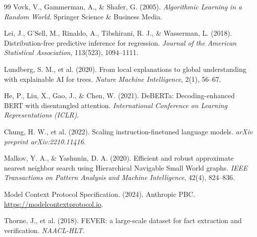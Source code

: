 \documentclass[11pt,a4paper]{article}
\begin{document}
\clearpage
\begin{thebibliography}{99}\small
{}
Vovk, V., Gammerman, A., \& Shafer, G. (2005). \emph{Algorithmic Learning in a Random World}. Springer Science \& Business Media.

Lei, J., G'Sell, M., Rinaldo, A., Tibshirani, R. J., \& Wasserman, L. (2018). Distribution-free predictive inference for regression. \emph{Journal of the American Statistical Association}, 113(523), 1094--1111.

Lundberg, S. M., et al. (2020). From local explanations to global understanding with explainable AI for trees. \emph{Nature Machine Intelligence}, 2(1), 56--67.

He, P., Liu, X., Gao, J., \& Chen, W. (2021). DeBERTa: Decoding-enhanced BERT with disentangled attention. \emph{International Conference on Learning Representations (ICLR)}.

Chung, H. W., et al. (2022). Scaling instruction-finetuned language models. \emph{arXiv preprint arXiv:2210.11416}.

Malkov, Y. A., \& Yashunin, D. A. (2020). Efficient and robust approximate nearest neighbor search using Hierarchical Navigable Small World graphs. \emph{IEEE Transactions on Pattern Analysis and Machine Intelligence}, 42(4), 824--836.

Model Context Protocol Specification. (2024). Anthropic PBC. \url{https://modelcontextprotocol.io}.

Thorne, J., et al. (2018). FEVER: a large-scale dataset for fact extraction and verification. \emph{NAACL-HLT}.
\end{thebibliography}
\end{document}
